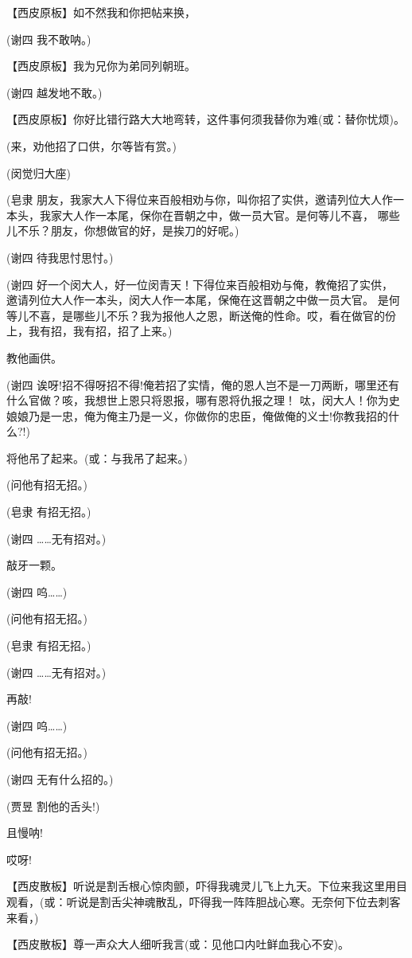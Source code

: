 【西皮原板】如不然我和你把帖来换，

(谢四 我不敢呐。)

【西皮原板】我为兄你为弟同列朝班。

(谢四 越发地不敢。)

【西皮原板】你好比错行路大大地弯转，这件事何须我替你为难(或：替你忧烦)。

(来，劝他招了口供，尔等皆有赏。)

(闵觉归大座)

(皂隶 朋友，我家大人下得位来百般相劝与你，叫你招了实供，邀请列位大人作一
本头，我家大人作一本尾，保你在晋朝之中，做一员大官。是何等儿不喜，
哪些儿不乐？朋友，你想做官的好，是挨刀的好呢。)

(谢四 待我思忖思忖。)

(谢四 好一个闵大人，好一位闵青天！下得位来百般相劝与俺，教俺招了实供，
邀请列位大人作一本头，闵大人作一本尾，保俺在这晋朝之中做一员大官。
是何等儿不喜，是哪些儿不乐？我为报他人之恩，断送俺的性命。哎，看在做官的份上，我有招，我有招，招了上来。)

教他画供。

(谢四
诶呀!招不得呀招不得!俺若招了实情，俺的恩人岂不是一刀两断，哪里还有什么官做？咳，我想世上恩只将恩报，哪有恩将仇报之理！
呔，闵大人！你为史娘娘乃是一忠，俺为俺主乃是一义，你做你的忠臣，俺做俺的义士!你教我招的什么?!)

将他吊了起来。(或：与我吊了起来。)

(问他有招无招。)

(皂隶 有招无招。)

(谢四 \ldots{}\ldots{}无有招对。)

敲牙一颗。

(谢四 呜\ldots{}\ldots{})

(问他有招无招。)

(皂隶 有招无招。)

(谢四 \ldots{}\ldots{}无有招对。)

再敲!

(谢四 呜\ldots{}\ldots{})

(问他有招无招。)

(谢四 无有什么招的。)

(贾昱 割他的舌头!)

且慢呐!

哎呀!

【西皮散板】听说是割舌根心惊肉颤，吓得我魂灵儿飞上九天。下位来我这里用目观看，(或：听说是割舌尖神魂散乱，吓得我一阵阵胆战心寒。无奈何下位去刺客来看，)

【西皮散板】尊一声众大人细听我言(或：见他口内吐鲜血我心不安)。

